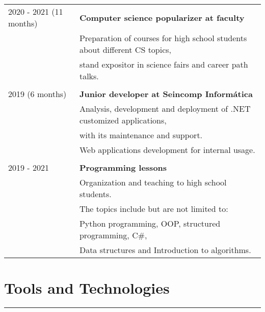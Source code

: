 \documentclass{article}
\begin{document}
\begin{tabular}{l l}
    2020 - 2021 (11 months) & \textbf{Computer science popularizer at faculty} \\
                            & Preparation of courses for high school students about different CS topics, \\ 
                            & stand expositor in science fairs and career path talks. \\
                            \\
    2019 (6 months) & \textbf{Junior developer at Seincomp Informática} \\
                    &  Analysis, development and deployment of .NET customized applications, \\ 
                    & with its maintenance and support. \\
                    & Web applications development for internal usage.\\
                    \\
    2019 - 2021     & \textbf{Programming lessons}  \\
                    & Organization and teaching to high school students. \\
                    & The topics include but are not limited to: \\ 
                    & Python programming, OOP, structured programming, C\#, \\ 
                    & Data structures and Introduction to algorithms.
\end{tabular}

\section*{Tools and Technologies} 
\hrule
\

\
    
\end{document}

